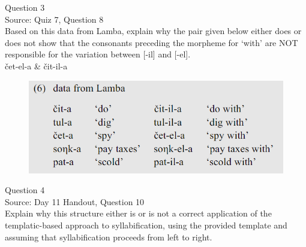 \documentclass[12pt]{article}
\begin{document}
\newpage

{\large Question 3}\\

Source: Quiz 7, Question 8\\

Based on this data from Lamba, explain why the pair given below either does or does not show that the consonants preceding the morpheme for `with' are NOT responsible for the variation between [-il] and [-el].\\

čet-el-a \& čit-il-a

\begin{figure}[H]
\includegraphics{../images/peng119_lamba.png}
\end{figure}

\newpage

{\large Question 4}\\

Source: Day 11 Handout, Question 10\\

Explain why this structure either is or is not a correct application of the templatic-based approach to syllabification, using the provided template and assuming that syllabification proceeds from left to right.\\
\end{document}
